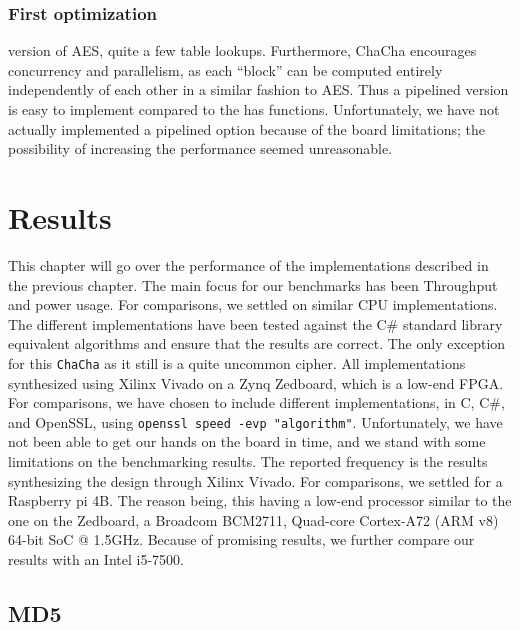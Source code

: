 \documentclass[a4paper, openany]{book}
\begin{document}
\begin{abstact}
\subsection{First optimization}
\label{ChaCha1}
version of AES, quite a few table lookups. Furthermore, ChaCha encourages concurrency and parallelism, as each ``block'' can be computed entirely independently of each other in a similar fashion to AES. Thus a pipelined version is easy to implement compared to the has functions. Unfortunately, we have not actually implemented a pipelined option because of the board limitations; the possibility of increasing the performance seemed unreasonable.

\chapter{Results}
\label{sec:orgc34d4b6}
This chapter will go over the performance of the implementations described in the previous chapter. The main focus for our benchmarks has been Throughput and power usage. For comparisons, we settled on similar CPU implementations.
The different implementations have been tested against the C\# standard library equivalent algorithms and ensure that the results are correct. The only exception for this \texttt{ChaCha} as it still is a quite uncommon cipher. All implementations synthesized using Xilinx Vivado on a Zynq Zedboard, which is a low-end FPGA. For comparisons, we have chosen to include different implementations, in C, C\#, and OpenSSL, using \texttt{openssl speed -evp "algorithm"}. Unfortunately, we have not been able to get our hands on the board in time, and we stand with some limitations on the benchmarking results. The reported frequency is the results synthesizing the design through Xilinx Vivado. For comparisons, we settled for a Raspberry pi 4B. The reason being, this having a low-end processor similar to the one on the Zedboard, a Broadcom BCM2711, Quad-core Cortex-A72 (ARM v8) 64-bit SoC @ 1.5GHz. Because of promising results, we further compare our results with an Intel i5-7500.

\section{MD5}
\label{sec:org020a3df}
\label{sec:MD5performance}

\end{abstact}
\end{document}
